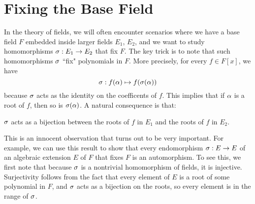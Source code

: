 \section{Fixing the Base Field}
In the theory of fields, we will often encounter scenarios where we have a base field $F$ embedded inside larger fields $E_1$, $E_2$, and we want to study homomorphisms $\sigma: E_1 \rightarrow E_2$ that fix $F$. The key trick is to note that such homomorphisms $\sigma$ ``fix" polynomials in $F$. More precisely, for every $f \in F[x]$, we have
\[
    \sigma: f(\alpha) \mapsto f(\sigma(\alpha))
\]
because $\sigma$ acts as the identity on the coefficents of $f$.
This implies that if $\alpha$ is a root of $f$, then so is $\sigma(\alpha)$. A natural consequence is that:
\begin{center}
    $\sigma$ acts as a bijection between the roots of $f$ in $E_1$ and the roots of $f$ in $E_2$.
\end{center}
This is an innocent observation that turns out to be very important. For example, we can use this result to show that every endomorphism $\sigma: E \rightarrow E$ of an algebraic extension $E$ of $F$ that fixes $F$ is an automorphism. To see this, we first note that because $\sigma$ is a nontrivial homomorphism of fields, it is injective. Surjectivity follows from the fact that every element of $E$ is a root of some polynomial in $F$, and $\sigma$ acts as a bijection on the roots, so every element is in the range of $\sigma$.
